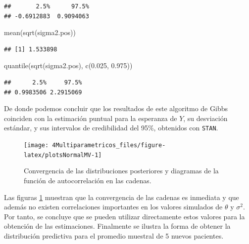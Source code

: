 \documentclass[
  10pt,
  spanish,
]{book}
\newenvironment{Shaded}{\begin{snugshade}}{\end{snugshade}}
\newcommand{\FloatTok}[1]{\textcolor[rgb]{0.00,0.00,0.81}{#1}}
\newcommand{\FunctionTok}[1]{\textcolor[rgb]{0.00,0.00,0.00}{#1}}
\newcommand{\NormalTok}[1]{#1}
\theoremstyle{definition}
\theoremstyle{definition}
\theoremstyle{definition}
\theoremstyle{definition}
\theoremstyle{remark}
\begin{document}
\begin{verbatim}
##       2.5%      97.5% 
## -0.6912883  0.9094063
\end{verbatim}

\begin{Shaded}
\begin{Highlighting}[]
\FunctionTok{mean}\NormalTok{(}\FunctionTok{sqrt}\NormalTok{(sigma2.pos))}
\end{Highlighting}
\end{Shaded}

\begin{verbatim}
## [1] 1.533898
\end{verbatim}

\begin{Shaded}
\begin{Highlighting}[]
\FunctionTok{quantile}\NormalTok{(}\FunctionTok{sqrt}\NormalTok{(sigma2.pos), }\FunctionTok{c}\NormalTok{(}\FloatTok{0.025}\NormalTok{, }\FloatTok{0.975}\NormalTok{))}
\end{Highlighting}
\end{Shaded}

\begin{verbatim}
##      2.5%     97.5% 
## 0.9983506 2.2915069
\end{verbatim}

De donde podemos concluir que los resultados de este algoritmo de Gibbs coinciden con la estimación puntual para la esperanza de \(Y\), su desviación estándar, y sus intervalos de credibilidad del 95\%, obtenidos con \texttt{STAN}.

\begin{figure}

{\centering \texttt{[image: 4Multiparametricos\_files/figure-latex/plotsNormalMV-1]} 

}

\caption{Convergencia de las distribuciones posteriores y diagramas de la función de autocorrelación en las cadenas.}\label{fig:plotsNormalMV}
\end{figure}

Las figuras \ref{fig:plotsNormalMV} muestran que la convergencia de las cadenas es inmediata y que además no existen correlaciones importantes en los valores simulados de \(\theta\) y \(\sigma^2\). Por tanto, se concluye que se pueden utilizar directamente estos valores para la obtención de las estimaciones. Finalmente se ilustra la forma de obtener la distribución predictiva para el promedio muestral de 5 nuevos pacientes.
\end{document}
